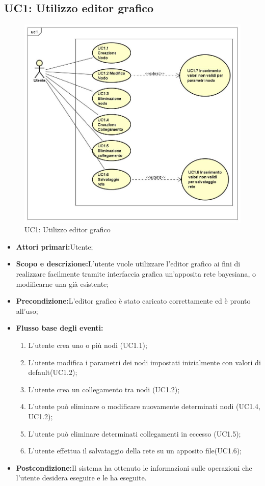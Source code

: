 \subsection{UC1: Utilizzo editor grafico}
\begin{figure} [H]
	\centering
	\includegraphics[scale=0.45]{Img/UC1}
	\caption{UC1: Utilizzo editor grafico}\label{}
\end{figure}
\begin{itemize}
	\item{\textbf{Attori primari:}Utente;}
	\item{\textbf{Scopo e descrizione:}L'utente vuole utilizzare l'editor grafico ai fini di realizzare facilmente tramite interfaccia grafica un'apposita rete bayesiana, o modificarne una già esistente;}
	\item{\textbf{Precondizione:}L'editor grafico è stato caricato correttamente ed è pronto all'uso;}
	\item{\textbf{Flusso base degli eventi:}
		\begin{enumerate}
			\item{L'utente crea uno o più nodi (UC1.1);}
			\item{L'utente modifica i parametri dei nodi impostati inizialmente con valori di default(UC1.2);}
			\item{L'utente crea un collegamento tra nodi (UC1.2);}
			\item{L'utente può eliminare o modificare nuovamente determinati nodi (UC1.4, UC1.2);}
			\item{L'utente può eliminare determinati collegamenti in eccesso (UC1.5);}
			\item{L'utente effettua il salvataggio della rete su un apposito file(UC1.6);}
		\end{enumerate}
	}
	\item{\textbf{Postcondizione:}Il sistema ha ottenuto le informazioni sulle operazioni che l'utente desidera eseguire e le ha eseguite.}
\end{itemize}

